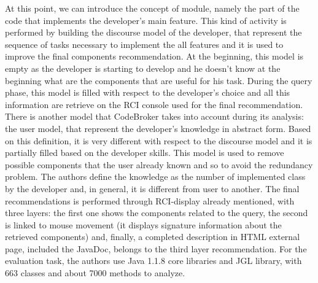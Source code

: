 At this point, we can introduce the concept of module, namely the part of the code that implements the developer's main feature. This kind of activity is performed by building the discourse model of the developer, that represent the sequence of tasks necessary to implement the all features and it is used to improve the final components recommendation. At the beginning, this model is empty as the developer is starting to develop and he doesn't know at the beginning what are the components that are useful for his task. During the query phase, this model is filled with respect to the developer's choice and all this information are retrieve on the RCI console used for the final recommendation. There is another model that CodeBroker takes into account during its analysis: the user model, that represent the developer's knowledge in abstract form. Based on this definition, it is very different with respect to the discourse model and it is partially filled based on the developer skills. This model is used to remove possible components that the user already known and so to avoid the redundancy problem. The authors define the knowledge as the number of implemented class by the developer and, in general, it is different from user to another. The final recommendations is performed through RCI-display already mentioned, with three layers: the first one shows the components related to the query, the second is linked to mouse movement (it displays signature information about the retrieved components) and, finally, a completed description in HTML external page, included the JavaDoc, belongs to the third layer recommendation. For the evaluation task, the authors use Java 1.1.8 core libraries and JGL library, with 663 classes and about 7000 methods to analyze. 

